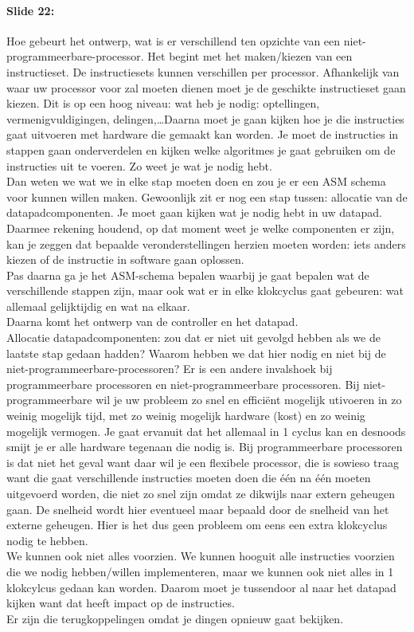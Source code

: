 \documentclass[10pt,a4paper]{book}
\begin{document}
\paragraph{Slide 22:} Hoe gebeurt het ontwerp, wat is er verschillend ten opzichte van een niet-programmeerbare-processor. Het begint met het maken/kiezen van een instructieset. De instructiesets kunnen verschillen per processor. Afhankelijk van waar uw processor voor zal moeten dienen moet je de geschikte instructieset gaan kiezen. Dit is op een hoog niveau: wat heb je nodig: optellingen, vermenigvuldigingen, delingen,\ldots Daarna moet je gaan kijken hoe je die instructies gaat uitvoeren met hardware die gemaakt kan worden. Je moet de instructies in stappen gaan onderverdelen en kijken welke algoritmes je gaat gebruiken om de instructies uit te voeren. Zo weet je wat je nodig hebt.\\
Dan weten we wat we in elke stap moeten doen en zou je er een ASM schema voor kunnen willen maken. Gewoonlijk zit er nog een stap tussen: allocatie van de datapadcomponenten. Je moet gaan kijken wat je nodig hebt in uw datapad. Daarmee rekening houdend, op dat moment weet je welke componenten er zijn, kan je zeggen dat bepaalde veronderstellingen herzien moeten worden: iets anders kiezen of de instructie in software gaan oplossen.\\
Pas daarna ga je het ASM-schema bepalen waarbij je gaat bepalen wat de verschillende stappen zijn, maar ook wat er in elke klokcyclus gaat gebeuren: wat allemaal gelijktijdig en wat na elkaar.\\
Daarna komt het ontwerp van de controller en het datapad.\\
Allocatie datapadcomponenten: zou dat er niet uit gevolgd hebben als we de laatste stap gedaan hadden? Waarom hebben we dat hier nodig en niet bij de niet-programmeerbare-processoren? Er is een andere invalshoek bij programmeerbare processoren en niet-programmeerbare processoren. Bij niet-programmeerbare wil je uw probleem zo snel en effici\"ent mogelijk utivoeren in zo weinig mogelijk tijd, met zo weinig mogelijk hardware (kost) en zo weinig mogelijk vermogen. Je gaat ervanuit dat het allemaal in 1 cyclus kan en desnoods smijt je er alle hardware tegenaan die nodig is. Bij programmeerbare processoren is dat niet het geval want daar wil je een flexibele processor, die is sowieso traag want die gaat verschillende instructies moeten doen die \'e\'en na \'e\'en moeten uitgevoerd worden, die niet zo snel zijn omdat ze dikwijls naar extern geheugen gaan. De snelheid wordt hier eventueel maar bepaald door de snelheid van het externe geheugen. Hier is het dus geen probleem om eens een extra klokcyclus nodig te hebben.\\
We kunnen ook niet alles voorzien. We kunnen hooguit alle instructies voorzien die we nodig hebben/willen implementeren, maar we kunnen ook niet alles in 1 klokcylcus gedaan kan worden. Daarom moet je tussendoor al naar het datapad kijken want dat heeft impact op de instructies.\\
Er zijn die terugkoppelingen omdat je dingen opnieuw gaat bekijken.
\end{document}
